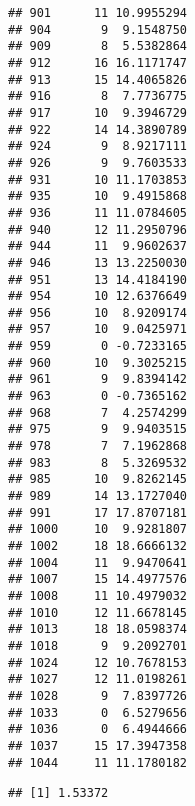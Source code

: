\documentclass[
]{article}
\newenvironment{Shaded}{\begin{snugshade}}{\end{snugshade}}
\newcommand{\DataTypeTok}[1]{\textcolor[rgb]{0.13,0.29,0.53}{#1}}
\newcommand{\DecValTok}[1]{\textcolor[rgb]{0.00,0.00,0.81}{#1}}
\newcommand{\FloatTok}[1]{\textcolor[rgb]{0.00,0.00,0.81}{#1}}
\newcommand{\KeywordTok}[1]{\textcolor[rgb]{0.13,0.29,0.53}{\textbf{#1}}}
\newcommand{\NormalTok}[1]{#1}
\newcommand{\OperatorTok}[1]{\textcolor[rgb]{0.81,0.36,0.00}{\textbf{#1}}}
\newcommand{\OtherTok}[1]{\textcolor[rgb]{0.56,0.35,0.01}{#1}}
\newcommand{\StringTok}[1]{\textcolor[rgb]{0.31,0.60,0.02}{#1}}
\begin{document}
\begin{verbatim}
## 901      11 10.9955294
## 904       9  9.1548750
## 909       8  5.5382864
## 912      16 16.1171747
## 913      15 14.4065826
## 916       8  7.7736775
## 917      10  9.3946729
## 922      14 14.3890789
## 924       9  8.9217111
## 926       9  9.7603533
## 931      10 11.1703853
## 935      10  9.4915868
## 936      11 11.0784605
## 940      12 11.2950796
## 944      11  9.9602637
## 946      13 13.2250030
## 951      13 14.4184190
## 954      10 12.6376649
## 956      10  8.9209174
## 957      10  9.0425971
## 959       0 -0.7233165
## 960      10  9.3025215
## 961       9  9.8394142
## 963       0 -0.7365162
## 968       7  4.2574299
## 975       9  9.9403515
## 978       7  7.1962868
## 983       8  5.3269532
## 985      10  9.8262145
## 989      14 13.1727040
## 991      17 17.8707181
## 1000     10  9.9281807
## 1002     18 18.6666132
## 1004     11  9.9470641
## 1007     15 14.4977576
## 1008     11 10.4979032
## 1010     12 11.6678145
## 1013     18 18.0598374
## 1018      9  9.2092701
## 1024     12 10.7678153
## 1027     12 11.0198261
## 1028      9  7.8397726
## 1033      0  6.5279656
## 1036      0  6.4944666
## 1037     15 17.3947358
## 1044     11 11.1780182
\end{verbatim}

\begin{Shaded}
\end{Shaded}

\begin{verbatim}
## [1] 1.53372
\end{verbatim}

\begin{Shaded}
\end{Shaded}
\end{document}
